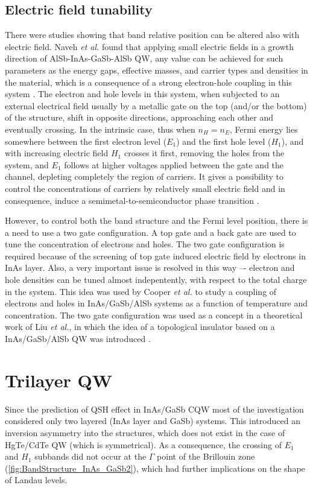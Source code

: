 \documentclass[titlepage,a4paper]{book}
\newcommand{\wciecie}{\quad\phantom{v}}
\begin{document}
\subsection{Electric field tunability}
\wciecie
There were studies showing that band relative position can be altered also with electric field. Naveh \textit{et al.} found that applying small electric fields in a growth direction of AlSb-InAs-GaSb-AlSb QW, any value can be achieved for such parameters as the energy gaps, effective masses, and carrier types and densities in the material, which is a consequence of a strong electron-hole coupling in this system \cite{Naveh_ElectricField}. The electron and hole levels in this system, when subjected to an external electrical field usually by a metallic gate on the top (and/or the bottom) of the structure, shift in opposite directions, approaching each other and eventually crossing. In the intrinsic case, thus when $n_H = n_E$, Fermi energy lies somewhere between the first electron level ($E_1$) and the first hole level ($H_1$), and with increasing electric field $H_1$ crosses it first, removing the holes from the system, and $E_1$ follows at higher voltages applied between the gate and the channel, depleting completely the region of carriers. It gives a possibility to control the concentrations of carriers by relatively small electric field and in consequence, induce a semimetal-to-semiconductor phase transition \cite{Mendez_ElectricField}.

However, to control both the band structure and the Fermi level position, there is a need to use a two gate configuration. A top gate and a back gate are used to tune the concentration of electrons and holes. The two gate configuration is required because of the screening of top gate induced electric field by electrons in InAs layer. Also, a very important issue is resolved in this way –- electron and hole densities can be tuned almost indepentently, with respect to the total charge in the system. This idea was used by Cooper \textit{et al.} \cite{Cooper_ElectricField} to study a coupling of electrons and holes in InAs/GaSb/AlSb systems as a function of temperature and concentration. The two gate configuration was used as a concept in a theoretical work of Liu \textit{et al.}, in which the idea of a topological insulator based on a InAs/GaSb/AlSb QW was introduced \cite{Liu_Topology}.

\clearpage
\section{Trilayer QW}
\wciecie
Since the prediction of QSH effect in InAs/GaSb CQW most of the investigation considered only two layered (InAs layer and GaSb) systems. This introduced an inversion asymmetry into the structures, which does not exist in the case of HgTe/CdTe QW (which is symmetrical). As a consequence, the crossing of $E_1$ and $H_1$ subbands did not occur at the $\Gamma$ point of the Brillouin zone \cite{Murakami_Trilayer} (\ref{fig:BandStructure_InAs_GaSb2}), which had further implications on the shape of Landau levels.
\end{document}
